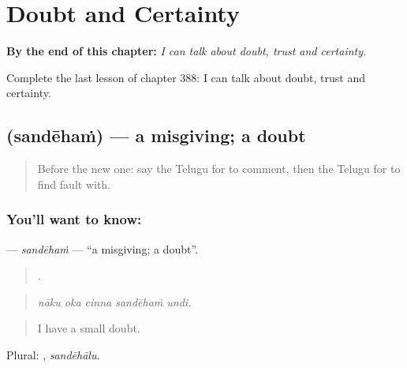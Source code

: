 
\chapter{Doubt and Certainty}
\label{ch:te-doubt-and-certainty}

\begin{chapteropening}
\textbf{By the end of this chapter:} \emph{I can talk about doubt, trust and certainty.}

Complete the last lesson of chapter 388: I can talk about doubt, trust and certainty.
\end{chapteropening}

\section[\texorpdfstring{\te{సందేహం} (sandēhaṁ)}{సందేహం (sandēhaṁ)}]{ (sandēhaṁ) — a misgiving; a doubt}

\label{lesson:TE-C388-sandeham}



\begin{quote}
Before the new one: say the Telugu for to comment, then the Telugu for to find fault with.
\end{quote}

\subsection*{You'll want to know: }
\textbf{} — \emph{sandēhaṁ} — \textquotedblleft{}a misgiving; a doubt\textquotedblright{}.

\begin{quote}
    .
\end{quote}

\begin{quote}
\emph{nāku oka cinna sandēhaṁ undi.}
\end{quote}

\begin{quote}
I have a small doubt.
\end{quote}

Plural: , \emph{sandēhālu}.

